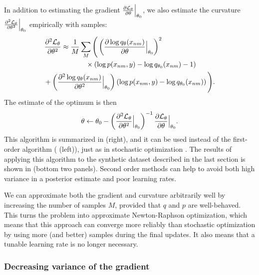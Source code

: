 In addition to estimating the gradient $\frac{\partial \mathcal{L}_\theta }{\partial \theta} \Bigr|_{\theta_0}$, we also estimate the curvature
$\frac{\partial^2 \mathcal{L}_\theta }{\partial {\theta}^2} \Bigr|_{\theta_0}$
empirically with samples:
\begin{align}
  \label{eq:empirical_second_order_estimates}
  \displaystyle \partll{\mathcal{L}_\theta }{\theta} & \approx
  \frac{1}{M} \sum_M \Bigg(
  \left( \partl{\log q_\theta(x_{nm})}{\theta} \Bigr|_{\theta_0} \right)^2 \\ \nonumber
  & \hspace{35pt} \times \left( \log p(x_{nm},  y) - \log q_{\theta_0}(x_{nm}) - 1 \right)  \\ \nonumber
 &   \hspace{-25pt} + \left( \partll{\log q_\theta(x_{nm})}{\theta} \Bigr|_{\theta_0} \right) \left( \log p(x_{nm},  y) - \log q_{\theta_0}(x_{nm}) \right) \Bigg). \nonumber
\end{align}
The estimate of the optimum is then
\begin{align}
  \displaystyle \theta \gets \theta_0 - \left( 
  \frac{\partial^2 \mathcal{L}_\theta }{\partial {\theta}^2} \Bigr|_{\theta_0}
  \right)^{-1}
  \frac{\partial \mathcal{L}_\theta }{\partial \theta} \Bigr|_{\theta_0}.
  \label{eq:second_order_updates}
\end{align}
This algorithm is summarized in
 (right), and it can be used instead
of the first-order algorithm
( (left)), just as in stochastic
optimization \citep{bottou:2004}.  The results of applying this
algorithm to the synthetic dataset described in the last section is
shown in  (bottom two
panels).  Second order methods can help to avoid both high variance in
a posterior estimate and poor learning rates.

We can approximate both the gradient and curvature arbitrarily well by
increasing the number of samples $M$, provided that $q$ and $p$ are
well-behaved.  This turns the problem into approximate Newton-Raphson
optimization, which means that this approach can converge more
reliably than stochastic optimization by using more (and better)
samples during the final updates.  It also means that a tunable
learning rate is no longer necessary.

\subsubsection{Decreasing variance of the gradient}
\label{sec:setting-c}

